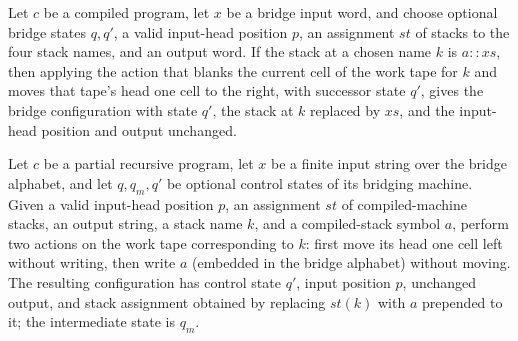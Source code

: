 \begin{lemma}
\label{Turing.bridgeCfg_pop}
\leanok
{}
Let $c$ be a compiled program, let $x$ be a bridge input word, and choose optional
bridge states $q,q'$, a valid input-head position $p$, an assignment $st$ of stacks to
the four stack names, and an output word. If the stack at a chosen name $k$ is $a::xs$,
then applying the action that blanks the current cell of the work tape for $k$ and moves
that tape's head one cell to the right, with successor state $q'$, gives the bridge
configuration with state $q'$, the stack at $k$ replaced by $xs$, and the input-head
position and output unchanged.
\end{lemma}

\begin{lemma}
\label{Turing.bridgeCfg_push}
\leanok
{}
Let $c$ be a partial recursive program, let $x$ be a finite input string over the bridge
alphabet, and let $q,q_m,q'$ be optional control states of its bridging machine. Given a
valid input-head position $p$, an assignment $st$ of compiled-machine stacks, an output
string, a stack name $k$, and a compiled-stack symbol $a$, perform two actions on the
work tape corresponding to $k$: first move its head one cell left without writing, then
write $a$ (embedded in the bridge alphabet) without moving. The resulting configuration
has control state $q'$, input position $p$, unchanged output, and stack assignment
obtained by replacing $st(k)$ with $a$ prepended to it; the intermediate state is $q_m$.
\end{lemma}


